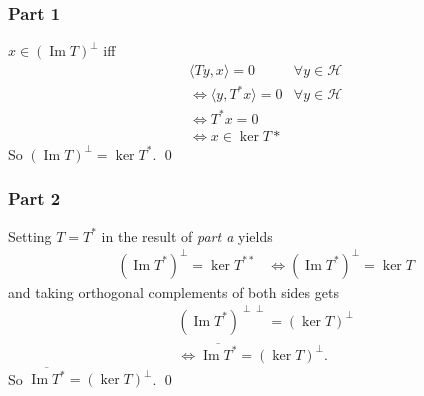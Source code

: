 \documentclass{unswmaths}
\begin{document}
\subsubsection*{Part 1}
$ x \in (\operatorname{Im} T)^\perp $ iff
\begin{align*}
    & \langle Ty, x \rangle = 0 &\forall y \in \mathcal{H}\\
    & \Leftrightarrow \langle y, T^* x \rangle = 0 & \forall y \in \mathcal{H} \\
    & \Leftrightarrow T^* x = 0 \\
    & \Leftrightarrow x \in \ker T*
\end{align*}
So $ (\operatorname{Im} T)^\perp = \ker T^* $. \qed

\subsubsection*{Part 2}
Setting $ T = T^* $ in the result of \emph{part a} yields
\begin{align*}
    &(\operatorname{Im} T^*)^\perp = \ker T^{**}
    & \Leftrightarrow  (\operatorname{Im} T^*)^\perp = \ker T
\end{align*}
and taking orthogonal complements of both sides gets
\begin{align*}
    & (\operatorname{Im} T^*)^{\perp \perp} = (\ker T)^\perp \\
    & \Leftrightarrow \overline{\operatorname{Im} T^*} = (\ker T)^\perp.
\end{align*}
So $ \overline{\operatorname{Im} T^*} = (\ker T)^\perp $. \qed
\end{document}
